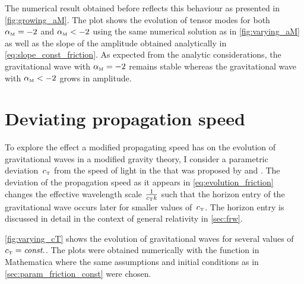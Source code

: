 \documentclass[12pt,parskip=half]{scrreprt}
\begin{document}
The numerical result obtained before reflects this behaviour as presented in \autoref{fig:growing_aM}. The plot shows the evolution of tensor modes for both \({\alpha_{\textnormal{\tiny{M}}}} = -2\) and \({\alpha_{\textnormal{\tiny{M}}}} < -2\) using the same numerical solution as in \autoref{fig:varying_aM} as well as the slope of the amplitude obtained analytically in \eqref{eq:slope_const_friction}. As expected from the analytic considerations, the gravitational wave with \({\alpha_{\textnormal{\tiny{M}}}} = -2\) remains stable whereas the gravitational wave with \({\alpha_{\textnormal{\tiny{M}}}} < -2\) grows in amplitude.



\section{Deviating propagation speed}\label{sec:param_dev_prop_speed}

To explore the effect a modified propagating speed has on the evolution of gravitational waves in a modified gravity theory, I consider a parametric deviation~\({c_{\textnormal{\tiny{T}}}}\) from the speed of light in the  that was proposed by \textcite{Amendola2014} and \textcite{Raveri2014}. The deviation of the propagation speed as it appears in \eqref{eq:evolution_friction} changes the effective wavelength scale \(\frac{1}{{c_{\textnormal{\tiny{T}}}} k}\) such that the horizon entry of the gravitational wave occurs later for smaller values of~\({c_{\textnormal{\tiny{T}}}}\). The horizon entry is discussed in detail in the context of general relativity in \autoref{sec:frw}.

\autoref{fig:varying_cT} shows the evolution of gravitational waves for several values of \({c_{\textnormal{\tiny{T}}}}=\textnormal{\textit{const.}}\). The plots were obtained numerically with the  function in Mathematica where the same assumptions and initial conditions as in \autoref{sec:param_friction_const} were chosen.

\end{document}
